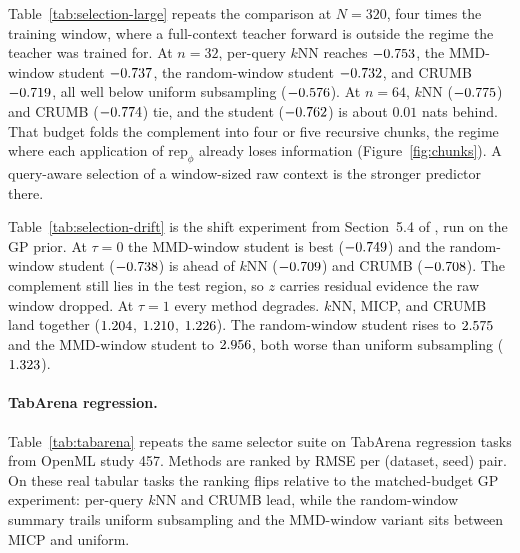 \documentclass{article}
\newcommand{\rep}{\mathrm{rep}}
\begin{document}
Table~\ref{tab:selection-large} repeats the comparison at $N = 320$, four
times the training window, where a full-context teacher forward is outside
the regime the teacher was trained for. At $n = 32$, per-query $k$NN
reaches $-0.753$, the MMD-window student
$-0.737$, the random-window student
$-0.732$, and CRUMB $-0.719$, all well
below uniform subsampling ($-0.576$). At $n = 64$,
$k$NN ($-0.775$) and CRUMB ($-0.774$)
tie, and the student ($-0.762$) is about $0.01$ nats
behind. That budget folds the complement into four or five recursive
chunks, the regime where each application of $\rep_\phi$ already loses
information (Figure~\ref{fig:chunks}). A query-aware selection of a
window-sized raw context is the stronger predictor there.

\begin{table}[t]
\centering
\caption{Covariate drift along $x$, budget $n = 32$, training pool drawn
from the lower half of $x$ and capped at $160$ points ($40$ data sets).
$\tau = 0$ draws the test query from that same half; $\tau = 1$ draws it
from the disjoint upper half. Test NLL, mean $\pm$ s.e. Bold is the lowest
mean in the column.}
\label{tab:selection-drift}

\end{table}

Table~\ref{tab:selection-drift} is the shift experiment from Section~5.4 of
\citet{heredge2026crumb}, run on the GP prior. At $\tau = 0$ the MMD-window student is best
($-0.749$) and the random-window student
($-0.738$) is ahead of $k$NN ($-0.709$) and CRUMB
($-0.708$). The complement still lies in the test region, so
$z$ carries residual evidence the raw window dropped. At $\tau = 1$ every
method degrades. $k$NN, MICP, and CRUMB land together
($1.204$, $1.210$,
$1.226$). The random-window student rises to
$2.575$ and the MMD-window student to
$2.956$, both worse than uniform subsampling
($1.323$).

\paragraph{TabArena regression.}
Table~\ref{tab:tabarena} repeats the same selector suite on TabArena
regression tasks from OpenML study 457. Methods are
ranked by RMSE per (dataset, seed) pair. On these real tabular tasks the
ranking flips relative to the matched-budget GP experiment: per-query
$k$NN and CRUMB lead, while the random-window summary trails uniform
subsampling and the MMD-window variant sits between MICP and uniform.
\end{document}
